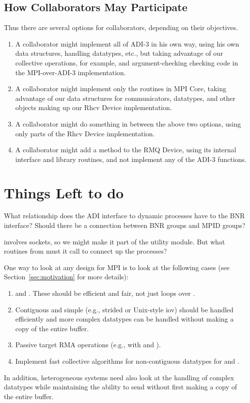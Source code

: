 \documentclass{article}
\begin{document}
\subsection{How Collaborators May Participate}
\label{sec:collaborators}

Thus there are several options for collaborators, depending on their
objectives.
\begin{enumerate}
\item A collaborator might implement all of ADI-3 in his own way, using his
  own data structures, handling datatypes, etc., but taking advantage of our
  collective operations, for example, and argument-checking checking code in
  the MPI-over-ADI-3 implementation.
\item A collaborator might implement only the routines in MPI Core, taking
  advantage of our data structures for communicators, datatypes, and other
  objects making up our Rhcv Device implementation.
\item A collaborator might do something in between the above two options,
  using only parts of the Rhcv Device implementation.
\item A collaborator might add a method to the RMQ Device, using its internal
  interface and library routines, and not implement any of the ADI-3 functions.
\end{enumerate}

\section{Things Left to do}
What relationship does the ADI interface to dynamic processes 
have to the BNR interface?  Should there be a connection between BNR groups
and MPID groups?

 involves sockets, so we might make it part of the
utility module.  But what routines from  must it call
to connect up the processes?

One way to look at any design for MPI is to look at the following
cases (see Section~\ref{sec:motivation} for more details):
\begin{enumerate}
\item {} and .  These should be
efficient and fair, not just loops over .
\item Contiguous and simple (e.g., strided or Unix-style iov) should
be handled efficiently and more complex datatypes can be handled
without making a copy of the entire buffer.  
\item Passive target RMA operations (e.g.,  with
 and ).
\item Implement fast collective algorithms for non-contiguous
datatypes for  and .
\end{enumerate}
In addition, heterogeneous systems need also look at the handling of
complex datatypes while maintaining the ability to send without first
making a copy of the entire buffer.
\end{document}
